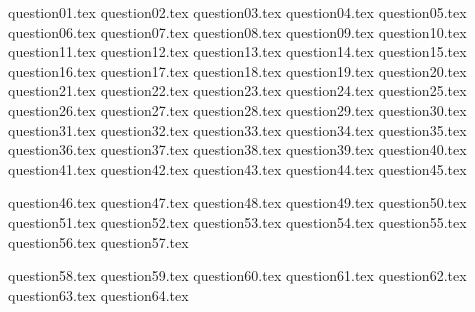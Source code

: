 \documentclass[a4paper, 11pt]{article}
\begin{document}
\tableofcontents

\newpage

{question01.tex}
{question02.tex}
{question03.tex}
{question04.tex}
{question05.tex}
{question06.tex}
{question07.tex}
{question08.tex}
{question09.tex}
{question10.tex}
{question11.tex}
{question12.tex}
{question13.tex}
{question14.tex}
{question15.tex}
{question16.tex}
{question17.tex}
{question18.tex}
{question19.tex}
{question20.tex}
{question21.tex}
{question22.tex}
{question23.tex}
{question24.tex}
{question25.tex}
{question26.tex}
{question27.tex}
{question28.tex}
{question29.tex}
{question30.tex}
{question31.tex}
{question32.tex}
{question33.tex}
{question34.tex}
{question35.tex}
{question36.tex}
{question37.tex}
{question38.tex}
{question39.tex}
{question40.tex}
{question41.tex}
{question42.tex}
{question43.tex}
{question44.tex}
{question45.tex}

\renewcommand{\A}{\mathfrak{A}}
\renewcommand{\B}{\mathfrak{B}}

{question46.tex}
{question47.tex}
{question48.tex}
{question49.tex}
{question50.tex}
{question51.tex}
{question52.tex}
{question53.tex}
{question54.tex}
{question55.tex}
{question56.tex}
{question57.tex}

\renewcommand{\A}{\mathcal{A}}
\renewcommand{\B}{\mathcal{B}}

{question58.tex}
{question59.tex}
{question60.tex}
{question61.tex}
{question62.tex}
{question63.tex}
{question64.tex}
\end{document}
